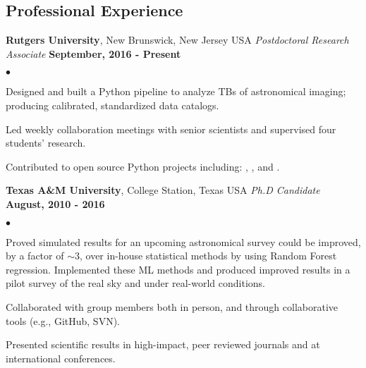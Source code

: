 \documentclass[margin,line, 11pt]{res}
\newenvironment{list2}{
  \begin{list}{$\bullet$}{%
      \setlength{\itemsep}{0in}
      \setlength{\parsep}{0in} \setlength{\parskip}{0in}
      \setlength{\topsep}{0in} \setlength{\partopsep}{0in}
      \setlength{\leftmargin}{0.2in}}}{\end{list}}
\begin{document}
\begin{resume}
\section{Professional \newline Experience}
\textbf{Rutgers University}, New Brunswick, New Jersey USA \newline
\textit{Postdoctoral Research Associate} \hfill \textbf{September, 2016 - Present}\newline
    \begin{list2}
    	\vspace*{-5mm}
    	\item Designed and built a Python pipeline to analyze TBs of astronomical imaging; producing calibrated, standardized data catalogs.
    	\item Led weekly collaboration meetings with senior scientists and supervised four students' research.
    	\item Contributed to open source Python projects including: \href{https://github.com/boada/photometrypipeline}{}, \href{http://astlib.sourceforge.net/}{}, and \href{https://github.com/boada/easyGalaxy}{}.
    \end{list2}
\vspace*{-4mm}

\textbf{Texas A\&M University}, College Station, Texas USA\newline
\textit{Ph.D Candidate} \hfill \textbf{August, 2010 - 2016}\newline
    \begin{list2}
    	\vspace*{-5mm}
      \item Proved simulated results for an upcoming astronomical survey could be improved, by a factor of $\sim3$, over in-house statistical methods by using Random Forest regression. Implemented these ML methods and produced improved results in a pilot survey of the real sky and under real-world conditions.
    	\item Collaborated with group members both in person, and through collaborative tools (e.g., GitHub, SVN).
    	\item Presented scientific results in high-impact, peer reviewed journals and at international conferences.
    \end{list2}
\vspace*{-4mm}


\end{resume}
\end{document}
